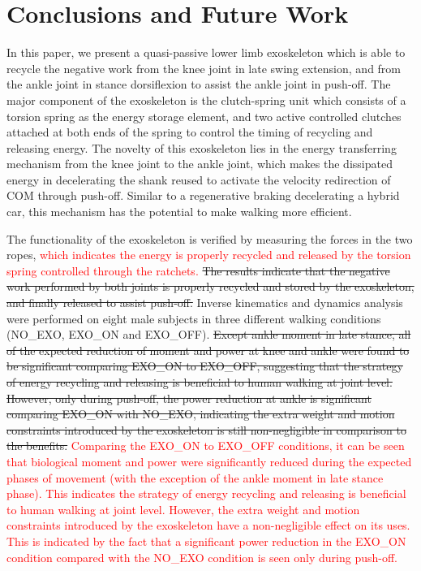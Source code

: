 \documentclass[twocolumn,cleanfoot,10pt]{asme2ej}
\begin{document}
\section{Conclusions and Future Work}
\label{sec:discussion}
In this paper, we present a quasi-passive lower limb exoskeleton which is able to recycle the negative work from the knee joint in late swing extension, and from the ankle joint in stance dorsiflexion to assist the ankle joint in push-off.
The major component of the exoskeleton is the clutch-spring unit which consists of a torsion spring as the energy storage element, and two active controlled clutches attached at both ends of the spring to control the timing of recycling and releasing energy.
The novelty of this exoskeleton lies in the energy transferring mechanism from the knee joint to the ankle joint, which makes the dissipated energy in decelerating the shank reused to activate the velocity redirection of COM through push-off.
Similar to a regenerative braking decelerating a hybrid car, this mechanism has the potential to make walking more efficient.

The functionality of the exoskeleton is verified by measuring the forces in the two ropes, \textcolor{red}{which indicates the energy is properly recycled and released by the torsion spring controlled through the ratchets.}
\sout{The results indicate that the negative work performed by both joints is properly recycled and stored by the exoskeleton, and finally released to assist push-off.}
Inverse kinematics and dynamics analysis were performed on eight male subjects in three different walking conditions (NO\_EXO, EXO\_ON and EXO\_OFF).
\sout{Except ankle moment in late stance, all of the expected reduction of moment and power at knee and ankle were found to be significant comparing EXO\_ON to EXO\_OFF, suggesting that the strategy of energy recycling and releasing is beneficial to human walking at joint level. However, only during push-off, the power reduction at ankle is significant comparing EXO\_ON with NO\_EXO, indicating the extra weight and motion constraints introduced by the exoskeleton is still non-negligible in comparison to the benefits.}
\textcolor{red}{Comparing the EXO\_ON to EXO\_OFF conditions, it can be seen that biological moment and power were significantly reduced during the expected phases of movement (with the exception of the ankle moment in late stance phase).
This indicates the strategy of energy recycling and releasing is beneficial to human walking at joint level.
However, the extra weight and motion constraints introduced by the exoskeleton have a non-negligible effect on its uses.
This is indicated by the fact that a significant power reduction in the EXO\_ON condition compared with the NO\_EXO condition is seen only during push-off.}
\end{document}
